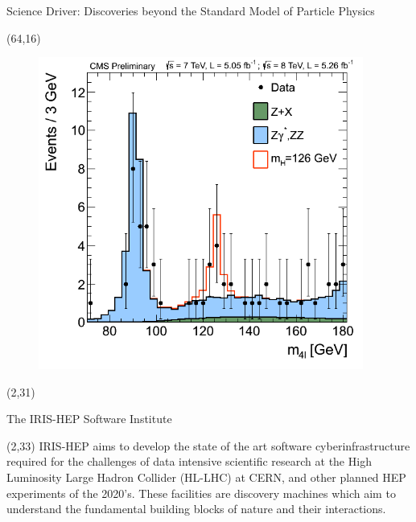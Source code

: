 \documentclass[final]{beamer}
\begin{document}
\begin{frame}{}
\begin{textblock}{80.0}
\begin{block}{Science Driver: Discoveries beyond the Standard Model of Particle Physics}
\begin{textblock}{16.0}(64,16)
\begin{figure}[H]
\includegraphics[width=0.95\textwidth]{images/Fig4-ZZMass_7Plus8TeV_70-180_3GeV.png}
\end{figure}
\end{textblock}

\end{block}
\end{textblock}



\begin{textblock}{20.0}(2,31)
\begin{block}{The IRIS-HEP Software Institute}
\begin{textblock}{20.0}(2,33)
IRIS-HEP aims to develop the state of the art software cyberinfrastructure required for the challenges of data intensive scientific research at the High Luminosity Large Hadron Collider (HL-LHC) at CERN, and other planned HEP experiments of the 2020’s. These facilities are discovery machines which aim to understand the fundamental building blocks of nature and their interactions.
\end{textblock}
\end{block}
\end{textblock}



\end{frame}
\end{document}
